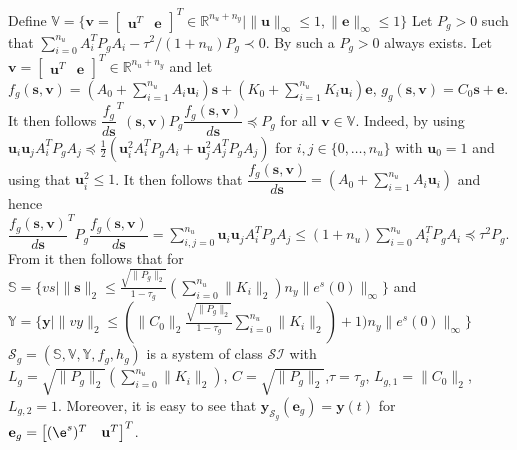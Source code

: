 \documentclass{ifacconf}
\def\rve{{\mathbf{e}}}
\def\rvu{{\mathbf{i}}}
\def\rvu{{\mathbf{u}}}
\def\rvy{{\mathbf{y}}}
\def\ve{{\bm{e}}}
\def\vs{{\bm{s}}}
\def\vu{{\bm{u}}}
\def\vv{{\bm{v}}}
\def\vy{{\bm{y}}}
\newcommand{\class}{\(\mathcal{SI}\)}
\begin{document}
\begin{pf}
 Define $\mathbb{V}=\{ \vv= \begin{bmatrix} \vu^T & \ve \end{bmatrix}^T \in \mathbb{R}^{n_u+n_y} \mid \|\vu\|_{\infty} \le 1, \|\ve\|_{\infty} \le 1 \}$
 Let $P_g > 0$ such that $\sum_{i=0}^{n_u} A_i^T P_g A_i- \tau^2/(1+n_u) P_g \prec 0$. By \cite{costa2006discrete} such a $P_g > 0$
 always exists. Let $\vv=\begin{bmatrix} \vu^T & \ve \end{bmatrix}^T \in \mathbb{R}^{n_u+n_y}$ and let
 $f_g(\vs,\vv)=(A_0+\sum_{i=1}^{n_u}A_i\vu_i)\vs+(K_0+\sum_{i=1}^{n_u} K_i\vu_i)\ve$, 
 $g_g(\vs,\vv)=C_0\vs+\ve$. It then follows $\dfrac{f_g}{d\vs}^T(\vs,\vv) P_g \dfrac{f_g(\vs,\vv)}{d\vs} \preceq P_g$
 for all $\vv \in \mathbb{V}$.
 Indeed, by using $\vu_i\vu_j A_i^TP_gA_j \preceq \frac{1}{2}(\vu_i^2 A_i^TP_gA_i + \vu_j^2 A_j^TP_g A_j)$ for $i,j \in \{0,\ldots,n_u\}$
 with $\vu_0=1$ and using that $\vu_i^2 \le 1$. It then follows that
 $\dfrac{f_g(\vs,\vv)}{d\vs}=(A_0+\sum_{i=1}^{n_u} A_i \rvu_i)$ and hence
$\dfrac{f_g(\vs,\vv)}{d\vs}^T P_g \dfrac{f_g(\vs,\vv)}{d\vs}=\sum_{i,j=0}^{n_u} \vu_i \vu_j A_i^T P_g A_j \le (1+n_u)\sum_{i=0}^{n_u} A_i^T P_g A_i \preceq \tau^2 P_g$. 
From \cite[Theorem 1]{PavlovTac2011} it then follows that for 
$\mathbb{S}=\{vs \mid \|\vs\|_2 \le \frac{\sqrt{\|P_g\|_2}}{1-\tau_g} (\sum_{i=0}^{n_u} \|K_i\|_2) n_y \|e^s(0)\|_{\infty} \}$
and $\mathbb{Y}=\{\vy \mid \|vy\|_2 \le (\|C_0\|_2 \frac{\sqrt{\|P_g\|_2}}{1-\tau_g} \sum_{i=0}^{n_u} \|K_i\|_2) +1) n_y \|e^s(0)\|_{\infty}  \}$
$\mathcal{S}_g=(\mathbb{S},\mathbb{V},\mathbb{Y},f_g,h_g)$ is a system of class \class{}
with $L_g=\sqrt{\|P_g\|_2}(\sum_{i=0}^{n_u} \|K_i\|_2)$, $C=\sqrt{\|P_g\|_2}$,$\tau=\tau_g$, $L_{g,1}=\|C_0\|_2$, $L_{g,2}=1$. 
Moreover, it is easy to see that $\rvy_{\mathcal{S}_g}(\rve_g) = \rvy(t)$ for $\rve_g=\begin{bmatrix} (\e^{s})^T & \rvu^T \end{bmatrix}^T$.
 \end{pf}
\end{document}
